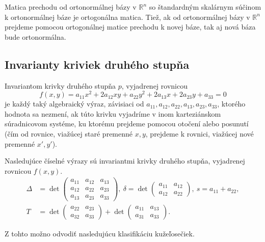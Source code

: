 \begin{theorem} 
Matica prechodu od ortonormálnej bázy v $\mathbb{R}^n$ so štandardným skalárnym súčinom k ortonormálnej báze je ortogonálna matica. Tiež, ak od ortonormálnej bázy v $\mathbb{R}^n$ prejdeme pomocou ortogonálnej matice prechodu k novej báze,
tak aj nová báza bude ortonormálna.
\end{theorem}

\subsection{Invarianty kriviek druhého stupňa}
\begin{definition}
Invariantom krivky druhého stupňa $p$, vyjadrenej rovnicou
$$
f(x, y) = a_{11}x^2 + 2a_{12}xy + a_{22}y^2 + 2a_{13}x + 2a_{23}y + a_{33} = 0
$$
je každý taký algebraický výraz, závisiaci od \(a_{11}, a_{12}, a_{22}, a_{13}, a_{23}, a_{33}\), ktorého hodnota sa nezmení, ak túto krivku vyjadríme v inom karteziánskom súradnicovom systéme, ku ktorému prejdeme pomocou otočení alebo posunutí (čím od rovnice, viažúcej staré premenné \(x, y\), prejdeme k rovnici, viažúcej nové premenné \(x', y'\)).
\end{definition}

\begin{theorem}
Nasledujúce číselné výrazy sú invariantmi krivky druhého stupňa, vyjadrenej rovnicou $f(x, y)$.
\begin{align*}
\Delta &= \det \begin{pmatrix} 
a_{11} & a_{12} & a_{13} \\ 
a_{12} & a_{22} & a_{23} \\
a_{13} & a_{23} & a_{33} \end{pmatrix}, \
\delta = \det \begin{pmatrix} a_{11} & a_{12} \\ a_{12} & a_{22} \end{pmatrix}, \
s = a_{11} + a_{22}, \\
T &= \det \begin{pmatrix} 
a_{22} & a_{23} \\
a_{32} & a_{33}  \end{pmatrix} + \det \begin{pmatrix} 
a_{11} & a_{13} \\ 
a_{31} & a_{33} \end{pmatrix}.
\end{align*}
\end{theorem}
Z tohto možno odvodiť nasledujúcu klasifikáciu kužeľosečiek.

